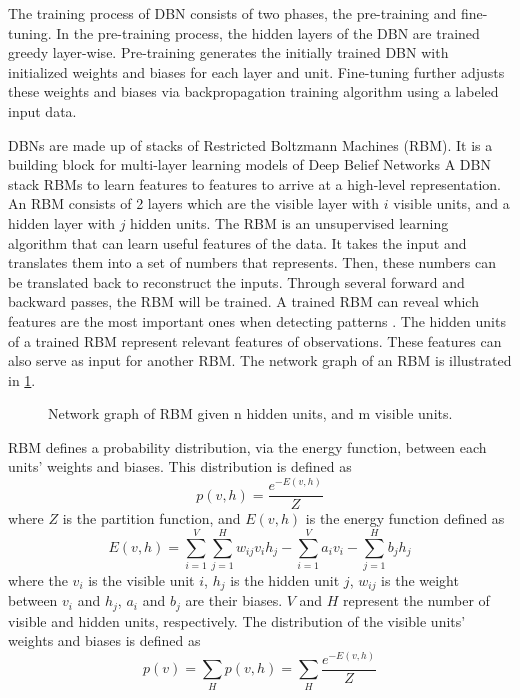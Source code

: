 The training process of DBN consists of two phases, the pre-training and fine-tuning. In the pre-training process, the hidden layers of the DBN are trained greedy layer-wise. Pre-training generates the initially trained DBN with initialized weights and biases for each layer and unit. Fine-tuning further adjusts these weights and biases via backpropagation training algorithm using a labeled input data. 

DBNs are made up of stacks of Restricted Boltzmann Machines (RBM). It is a building block for multi-layer learning models of Deep Belief Networks A DBN stack RBMs to learn features to features to arrive at a high-level representation. An RBM consists of 2 layers which are the visible layer with $i$ visible units, and a hidden layer with $j$ hidden units. The RBM is an unsupervised learning algorithm that can learn useful features of the data. It takes the input and translates them into a set of numbers that represents. Then, these numbers can be translated back to reconstruct the inputs. Through several forward and backward passes, the RBM will be trained. A trained RBM can reveal which features are the most important ones when detecting patterns . The hidden units of a trained RBM represent relevant features of observations. These features can also serve as input for another RBM. The network graph of an RBM is illustrated in \ref{fig:rbmexample}.

\begin{figure}[h]
	\centering
	\captionsetup{justification=centering}
	\caption{Network graph of RBM given n hidden units, and m visible units.}
	\label{fig:rbmexample}
\end{figure}

RBM defines a probability distribution, via the energy function, between each units’ weights and biases. This distribution is defined as
\begin{equation} \label{eq:1}
p(v, h) = \frac{e^{-E(v, h)}}{Z}
\end{equation}
\noindent where $Z$ is the partition function, and  $E(v, h)$ is the energy function defined as 
\begin{equation}\label{eq:2}
E(v, h) = \sum^V_{i=1} \sum^H_{j=1}  w_{ij} v_i h_j - \sum^V_{i=1}a_iv_i - \sum^H_{j=1}b_jh_j
\end{equation}
\noindent where the $v_i$ is the visible unit $i$, $h_j$ is the hidden unit $j$, $w_{ij}$ is the weight between $v_i$ and $h_j$, $a_i$ and $b_j$ are their biases. $V$ and $H$ represent the number of visible and hidden units, respectively. 
The distribution of the visible units’ weights and biases is defined as 
\begin{equation}\label{eq:3}
p(v) = \sum_H p(v, h) = \sum_H \frac{e ^ {-E(v, h)}}{Z}
\end{equation}

